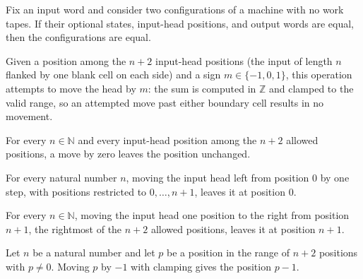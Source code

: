 \begin{lemma}
\label{Turing.Cfg.ext_zero_tapes}
\leanok
{}
Fix an input word and consider two configurations of a machine with no work tapes. If
their optional states, input-head positions, and output words are equal, then the
configurations are equal.
\end{lemma}

\begin{definition}
\label{Turing.moveInputPos}
\leanok
Given a position among the $n + 2$ input-head positions (the input of length $n$ flanked
by one blank cell on each side) and a sign $m \in \{-1, 0, 1\}$, this operation attempts
to move the head by $m$: the sum is computed in $\mathbb{Z}$ and clamped to the valid
range, so an attempted move past either boundary cell results in no movement.
\end{definition}

\begin{lemma}
\label{Turing.moveInputPos_zero}
\leanok
{}
For every $n\in\mathbb{N}$ and every input-head position among the $n+2$ allowed
positions, a move by zero leaves the position unchanged.
\end{lemma}

\begin{lemma}
\label{Turing.moveInputPos_leftBoundary}
\leanok
{}
For every natural number $n$, moving the input head left from position $0$ by one step,
with positions restricted to $0,\ldots,n+1$, leaves it at position $0$.
\end{lemma}

\begin{lemma}
\label{Turing.moveInputPos_rightBoundary}
\leanok
{}
For every $n\in\mathbb{N}$, moving the input head one position to the right from
position $n+1$, the rightmost of the $n+2$ allowed positions, leaves it at position
$n+1$.
\end{lemma}

\begin{lemma}
\label{Turing.moveInputPos_neg_of_ne_left}
\leanok
{}
Let $n$ be a natural number and let $p$ be a position in the range of $n+2$ positions
with $p\ne0$. Moving $p$ by $-1$ with clamping gives the position $p-1$.
\end{lemma}

